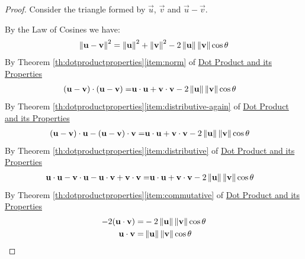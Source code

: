 \documentclass{ximera}
\begin{document}
\begin{proof} Consider the triangle formed by $\vec{u}$, $\vec{v}$ and $\vec{u}-\vec{v}$. 

\begin{center}
\end{center}

By the Law of Cosines we have:
\begin{align*}
\left\lVert\mathbf{u}-\mathbf{v}\right\rVert^2=\left\lVert\mathbf{u}\right\rVert^2+\left\lVert\mathbf{v}\right\rVert^2-2\left\lVert\mathbf{u}\right\rVert\left\lVert\mathbf{v}\right\rVert\cos\theta
\end{align*}
By Theorem \ref{th:dotproductproperties}\ref{item:norm} of \href{https://ximera.osu.edu/linearalgebradzv3/LinearAlgebraInteractiveIntro/VEC-0050/main}{Dot Product and its Properties}
\begin{align*}
(\mathbf{u}-\mathbf{v})\cdot (\mathbf{u}-\mathbf{v})=&\mathbf{u}\cdot \mathbf{u}+\mathbf{v}\cdot \mathbf{v}-2\left\lVert\mathbf{u}\right\rVert\left\lVert\mathbf{v}\right\rVert\cos\theta
\end{align*}
By Theorem \ref{th:dotproductproperties}\ref{item:distributive-again} of \href{https://ximera.osu.edu/linearalgebradzv3/LinearAlgebraInteractiveIntro/VEC-0050/main}{Dot Product and its Properties}
\begin{align*}
(\mathbf{u}-\mathbf{v})\cdot \mathbf{u}-(\mathbf{u}-\mathbf{v})\cdot \mathbf{v}=&\mathbf{u}\cdot \mathbf{u}+\mathbf{v}\cdot \mathbf{v}-2\left\lVert\mathbf{u}\right\rVert\left\lVert\mathbf{v}\right\rVert\cos\theta
\end{align*}
By Theorem \ref{th:dotproductproperties}\ref{item:distributive} of \href{https://ximera.osu.edu/linearalgebradzv3/LinearAlgebraInteractiveIntro/VEC-0050/main}{Dot Product and its Properties}
\begin{align*}
\mathbf{u}\cdot \mathbf{u}-\mathbf{v}\cdot\mathbf{u}-\mathbf{u}\cdot\mathbf{v}+\mathbf{v}\cdot \mathbf{v}=&\mathbf{u}\cdot \mathbf{u}+\mathbf{v}\cdot \mathbf{v}-2\left\lVert\mathbf{u}\right\rVert\left\lVert\mathbf{v}\right\rVert\cos\theta
\end{align*}
By Theorem \ref{th:dotproductproperties}\ref{item:commutative} of \href{https://ximera.osu.edu/linearalgebradzv3/LinearAlgebraInteractiveIntro/VEC-0050/main}{Dot Product and its Properties}
\begin{align*}
-2(\mathbf{u}\cdot \mathbf{v})=&-2\left\lVert\mathbf{u}\right\rVert\left\lVert\mathbf{v}\right\rVert\cos\theta\\
\mathbf{u}\cdot \mathbf{v}=&\left\lVert\mathbf{u}\right\rVert\left\lVert\mathbf{v}\right\rVert\cos\theta
\end{align*}
\end{proof}
\end{document}
